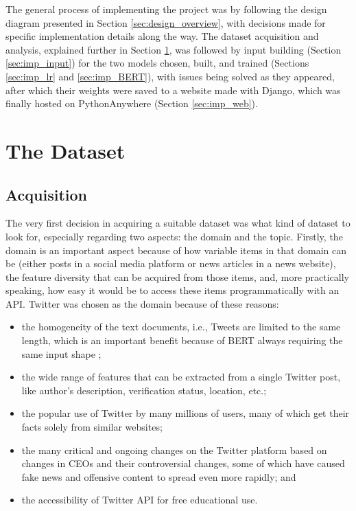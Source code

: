 \documentclass{l4proj}
\begin{document}
The general process of implementing the project was by following the design diagram presented in Section \ref{sec:design_overview}, with decisions made for specific implementation details along the way. The dataset acquisition and analysis, explained further in Section \ref{sec:imp_dataset}, was followed by input building (Section \ref{sec:imp_input}) for the two models chosen, built, and trained (Sections \ref{sec:imp_lr} and \ref{sec:imp_BERT}), with issues being solved as they appeared, after which their weights were saved to a website made with Django, which was finally hosted on PythonAnywhere (Section \ref{sec:imp_web}).

\section{The Dataset}
\label{sec:imp_dataset}

\subsection{Acquisition}

The very first decision in acquiring a suitable dataset was what kind of dataset to look for, especially regarding two aspects: the domain and the topic. Firstly, the domain is an important aspect because of how variable items in that domain can be (either posts in a social media platform or news articles in a news website), the feature diversity that can be acquired from those items, and, more practically speaking, how easy it would be to access these items programmatically with an API. Twitter was chosen as the domain because of these reasons:
\begin{itemize}
    \item the homogeneity of the text documents, i.e., Tweets are limited to the same length, which is an important benefit because of BERT always requiring the same input shape \citep{FakeNewsTrends};
    \item the wide range of features that can be extracted from a single Twitter post, like author's description, verification status, location, etc.;
    \item the popular use of Twitter by many millions of users, many of which get their facts solely from similar websites;
    \item the many critical and ongoing changes on the Twitter platform based on changes in CEOs and their controversial changes, some of which have caused fake news and offensive content to spread even more rapidly; and 
    \item the accessibility of Twitter API for free educational use.
\end{itemize}
\end{document}
